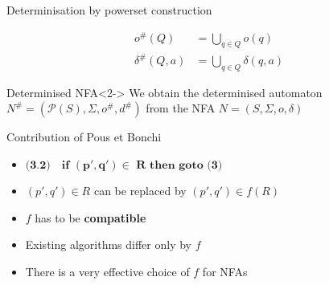 \documentclass[compress]{beamer}
\begin{document}
\begin{frame}{Determinisation by powerset construction}
  \begin{figure}
    \begin{align*}
      o^\#(Q) &= \bigcup_{q \in Q} o(q)\\
      \delta^\#(Q, a) &= \bigcup_{q \in Q} \delta(q, a)
    \end{align*}
  \end{figure}

  \begin{block}{Determinised NFA}<2->
    We obtain the determinised automaton $N^\# = (\mathcal{P}(S), \Sigma, o^{\#}, d^{\#})$
      from the NFA $N = (S, \Sigma, o, \delta)$
  \end{block}
\end{frame}

\begin{frame}{Contribution of Pous et Bonchi}
  \begin{itemize}
      \item<1-> $\textbf{(3.2)}\quad \textbf{if } \mathbf{(p', q') \in} \textbf{ R} \textbf{ then goto (3)}$
      \item<2-> $(p', q') \in R$ can be replaced by $(p', q') \in f(R)$
      \item<2-> $f$ has to be \textbf{compatible}
      \item<3-> Existing algorithms differ only by $f$
      \item<4-> There is a very effective choice of $f$ for NFAs
    \end{itemize}
\end{frame}
\end{document}
